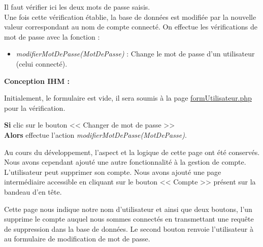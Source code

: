 			\begin{paragraphe}
                Il faut vérifier ici les deux mots de passe saisis. \\
                Une fois cette vérification établie, la base de données est modifiée par la nouvelle valeur correspondant au nom de compte connecté.
				On effectue les vérifications de mot de passe avec la fonction :
				\begin{itemize}
					\item \emph{modifierMotDePasse(MotDePasse)} : Change le mot de passe d'un utilisateur (celui connecté).
				\end{itemize}
			\end{paragraphe}

			\begin{paragraphe}
				\textbf{Conception IHM :}
			\end{paragraphe}

			\begin{paragraphe}
				Initialement, le formulaire est vide, il sera soumis à la page \underline{formUtilisateur.php} pour la vérification.
			\end{paragraphe}


			\begin{paragraphe}
				\textbf{Si} clic sur le bouton << Changer de mot de passe >> \\
				\textbf{Alors} effectue l'action \emph{modifierMotDePasse(MotDePasse)}.
			\end{paragraphe}

        \newpage
        
            \begin{paragraphe}
               Au cours du développement, l'aspect et la logique de cette page ont été conservés. Nous avons cependant ajouté une autre fonctionnalité
               à la gestion de compte. L'utilisateur peut supprimer son compte. Nous avons ajouté une page intermédiaire accessible en cliquant sur le bouton
               << Compte >> présent sur la bandeau d'en tête.
            \end{paragraphe}
               
            \begin{paragraphe}
                Cette page nous indique notre nom d'utilisateur et ainsi que deux boutons, l'un supprime le compte auquel nous sommes connectés en transmettant une requête de suppression dans la
                base de données. Le second bouton renvoie l'utilisateur à au formulaire de modification de mot de passe.
            \end{paragraphe}

